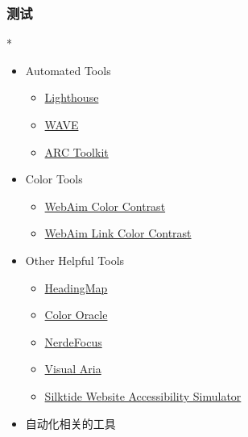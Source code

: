 \begin{paracol}{2}
\subsubsection{测试}
\switchcolumn[0]*%
\begin{itemize}
\item
  Automated Tools
  \begin{itemize}
  \item
    \href{https://chrome.google.com/webstore/detail/lighthouse/blipmdconlkpinefehnmjammfjpmpbjk}{Lighthouse}
  \item
    \href{https://chrome.google.com/webstore/detail/wave-evaluation-tool/jbbplnpkjmmeebjpijfedlgcdilocofh}{WAVE}
  \item
    \href{https://chrome.google.com/webstore/detail/arc-toolkit/chdkkkccnlfncngelccgbgfmjebmkmce?hl=en-US}{ARC
    Toolkit}
  \end{itemize}
\item
  Color Tools
  \begin{itemize}
  \item
    \href{https://webaim.org/resources/contrastchecker/}{WebAim Color
    Contrast}
  \item
    \href{https://webaim.org/resources/linkcontrastchecker}{WebAim Link
    Color Contrast}
  \end{itemize}
\item
  Other Helpful Tools
  \begin{itemize}
  \item
    \href{https://chrome.google.com/webstore/detail/headingsmap/flbjommegcjonpdmenkdiocclhjacmbi?hl=en…}{HeadingMap}
  \item
    \href{https://colororacle.org/}{Color Oracle}
  \item
    \href{https://chrome.google.com/webstore/detail/nerdefocus/lpfiljldhgjecfepfljnbjnbjfhennpd?hl=en-US…}{NerdeFocus}
  \item
    \href{https://chrome.google.com/webstore/detail/visual-aria/lhbmajchkkmakajkjenkchhnhbadmhmk?hl=en-US}{Visual
    Aria}
  \item
    \href{https://chrome.google.com/webstore/detail/silktide-website-accessib/okcpiimdfkpkjcbihbmhppldhiebhhaf?hl=en-US}{Silktide
    Website Accessibility Simulator}
  \end{itemize}
\end{itemize}
\switchcolumn
\begin{itemize}
\item
  自动化相关的工具
  \begin{itemize}

\end{itemize}
\end{itemize}
\end{paracol}
